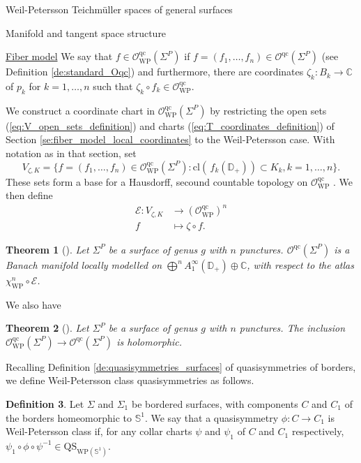 \documentclass[12pt]{amsart}
\newcommand{\disk}{\ensuremath{\mathbb{D}} } %
\newcommand{\riem}{\Sigma}  %
\theoremstyle{plain}
\newtheorem{theorem}{Theorem}[section]
\theoremstyle{definition}
\newtheorem{definition}[theorem]{Definition}
\theoremstyle{remark}
\numberwithin{equation}{section} %
\numberwithin{figure}{section} %
\begin{document}
\begin{section}{Weil-Petersson Teichm\"uller spaces of general surfaces}
\begin{subsection}{Manifold and tangent space structure}
\begin{subsubsection}{{\underline{Fiber model}}}
We say that $f \in \mathcal{O}^{\mathrm{qc}}_{\mathrm{WP}}(\riem^P)$ if $f =(f_1,\ldots,f_n) \in \mathcal{O}^{\mathrm{qc}}(\riem^P)$ (see Definition \ref{de:standard_Oqc}) and furthermore, there are coordinates
$\zeta_k:B_k \rightarrow \mathbb{C}$ of $p_k$ for $k=1,\ldots,n$ such that $\zeta_k \circ f_k \in \mathcal{O}_{\mathrm{WP}}^{\mathrm{qc}}$. 

We construct a coordinate chart in $\mathcal{O}^{\mathrm{qc}}_{\mathrm{WP}}(\riem^P)$ by restricting the open sets (\ref{eq:V_open_sets_definition}) and charts (\ref{eq:T_coordinates_definition}) of Section \ref{se:fiber_model_local_coordinates} to the Weil-Petersson case. With notation as in that section, set
\[  V_{\zeta,K} = \{ f=(f_1,\ldots,f_n) \in \mathcal{O}^{\mathrm{qc}}_{\mathrm{WP}}(\riem^P) : \mathrm{cl} (\, f_k(\disk_+)) \subset K_k, k=1,\ldots,n \}.    \]
These sets form a base for a Hausdorff, secound countable topology on $\mathcal{O}_{\mathrm{WP}}^{\mathrm{qc}}$ \cite{RSS_Filbert_arxiv}. 
We then define 
\begin{align*}  
 \mathcal{E}:V_{\zeta,K} & \rightarrow (\mathcal{O}^{\mathrm{qc}}_{\mathrm{WP}})^n \\
 f & \mapsto \zeta \circ f.
\end{align*} 
\begin{theorem}[\cite{RSS_Filbert1}]
 Let $\riem^P$ be a surface of genus $g$ with $n$ punctures.
  $\mathcal{O}^{\mathrm{qc}}({\riem}^P)$ is a Banach manifold  locally modelled on $\bigoplus^n A_1^\infty(\disk_+) \oplus \mathbb{C}$, with respect to the atlas $\chi_{\mathrm{WP}}^n \circ \mathcal{E}$.  
\end{theorem}
We also have
\begin{theorem}[\cite{RSS_Filbert1}] 
 Let $\riem^P$ be a surface of genus $g$ with $n$ punctures.
  The inclusion $\mathcal{O}_{\mathrm{WP}}^{\mathrm{qc}}(\riem^P) \rightarrow \mathcal{O}^{\mathrm{qc}}(\riem^P)$ is holomorphic. 
\end{theorem}
 Recalling Definition \ref{de:quasisymmetries_surfaces} of quasisymmetries of borders, we define Weil-Petersson class quasisymmetries as follows. 
 \begin{definition} Let $\riem$ and $\riem_1$ be bordered surfaces, with components $C$ and $C_1$ of the borders homeomorphic to $\mathbb{S}^1$. 
 We say that a quasisymmetry $\phi:C \rightarrow C_1$ is Weil-Petersson class if, for any collar charts $\psi$ and $\psi_1$ of $C$ and $C_1$ respectively, $\psi_1 \circ \phi \circ \psi^{-1} \in \mathrm{QS}_{\mathrm{WP}(\mathbb{S}^1)}$.  


\end{definition}
\end{subsubsection}
\end{subsection}
\end{section}
\end{document}
